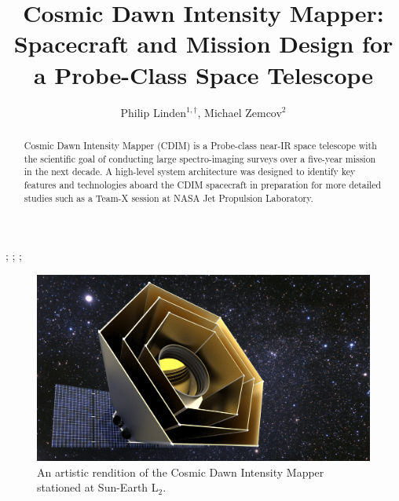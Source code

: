 \documentclass{ws-jai}
\begin{document}
\newcommand{\Ltwo}{L$_2$}
\newcommand{\red}[1]{{\color{red} #1}}

\catchline{}{}{}{}{} %


\title{Cosmic Dawn Intensity Mapper: \\Spacecraft and Mission Design for a Probe-Class Space Telescope}

\author{Philip Linden$^{1,\dagger}$, Michael Zemcov$^{2}$}

\address{
$^{1}$Department of Mechanical Engineering, Kate Gleason College of Engineering, Rochester
Institute of Technology, Rochester, NY 14623, USA, pjl7651@rit.edu\\
$^{2}$Center for Detectors, School of Physics and Astronomy, Rochester
Institute of Technology, Rochester, NY 14623, USA, zemcov@cfd.rit.edu
}

\maketitle


\begin{history}
;
;
;
\end{history}

\begin{abstract}
  Cosmic Dawn Intensity Mapper (CDIM) is a Probe-class near-IR space telescope with the scientific goal of conducting large spectro-imaging surveys over a five-year mission in the next decade.
  A high-level system architecture was designed to identify key features and technologies aboard the CDIM spacecraft in preparation for more detailed studies such as a Team-X session at NASA Jet Propulsion Laboratory.
\end{abstract}


\begin{figure}
  \centering
  \includegraphics[width=.8\linewidth]{figs/cdim_cover-render.jpg}
  \caption{An artistic rendition of the Cosmic Dawn Intensity Mapper stationed at Sun-Earth \Ltwo.}
\label{fig:cover}
\end{figure}
\end{document}
